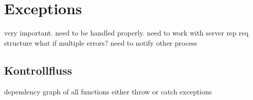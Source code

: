 



\section{Exceptions}

very important.
need to be handled properly.
need to work with server rep req structure
what if multiple errors?
need to notify other process

\subsection{Kontrollfluss}

dependency graph of all functions
either throw or catch exceptions


